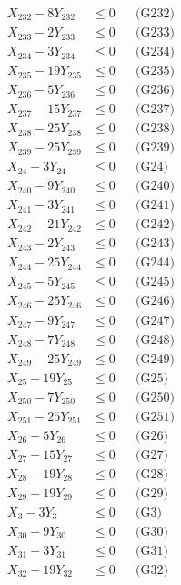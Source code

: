 \documentclass[a4paper,10pt]{article}
\begin{document}
{\begin{align}
X_{232} - 8Y_{232} &\leq 0 && \text{(G232)} \\
X_{233} - 2Y_{233} &\leq 0 && \text{(G233)} \\
X_{234} - 3Y_{234} &\leq 0 && \text{(G234)} \\
X_{235} - 19Y_{235} &\leq 0 && \text{(G235)} \\
X_{236} - 5Y_{236} &\leq 0 && \text{(G236)} \\
X_{237} - 15Y_{237} &\leq 0 && \text{(G237)} \\
X_{238} - 25Y_{238} &\leq 0 && \text{(G238)} \\
X_{239} - 25Y_{239} &\leq 0 && \text{(G239)} \\
X_{24} - 3Y_{24} &\leq 0 && \text{(G24)} \\
X_{240} - 9Y_{240} &\leq 0 && \text{(G240)} \\
X_{241} - 3Y_{241} &\leq 0 && \text{(G241)} \\
\allowbreak
X_{242} - 21Y_{242} &\leq 0 && \text{(G242)} \\
X_{243} - 2Y_{243} &\leq 0 && \text{(G243)} \\
X_{244} - 25Y_{244} &\leq 0 && \text{(G244)} \\
X_{245} - 5Y_{245} &\leq 0 && \text{(G245)} \\
X_{246} - 25Y_{246} &\leq 0 && \text{(G246)} \\
X_{247} - 9Y_{247} &\leq 0 && \text{(G247)} \\
X_{248} - 7Y_{248} &\leq 0 && \text{(G248)} \\
X_{249} - 25Y_{249} &\leq 0 && \text{(G249)} \\
X_{25} - 19Y_{25} &\leq 0 && \text{(G25)} \\
X_{250} - 7Y_{250} &\leq 0 && \text{(G250)} \\
X_{251} - 25Y_{251} &\leq 0 && \text{(G251)} \\
X_{26} - 5Y_{26} &\leq 0 && \text{(G26)} \\
X_{27} - 15Y_{27} &\leq 0 && \text{(G27)} \\
X_{28} - 19Y_{28} &\leq 0 && \text{(G28)} \\
X_{29} - 19Y_{29} &\leq 0 && \text{(G29)} \\
X_{3} - 3Y_{3} &\leq 0 && \text{(G3)} \\
X_{30} - 9Y_{30} &\leq 0 && \text{(G30)} \\
X_{31} - 3Y_{31} &\leq 0 && \text{(G31)} \\
X_{32} - 19Y_{32} &\leq 0 && \text{(G32)} \\

\end{align}}
\end{document}
